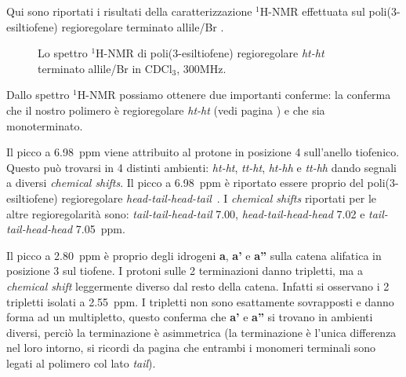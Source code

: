 Qui sono riportati i risultati della caratterizzazione $^1$H-NMR 
effettuata sul poli(3-esiltiofene) regioregolare terminato allile/Br . 
\begin{figure}
\caption{\footnotesize{Lo spettro $^1$H-NMR di poli(3-esiltiofene) regioregolare \emph{ht-ht} terminato allile/Br  in CDCl$_3$, 300MHz.}
\label{fig:P3HT-HNMR}}
\end{figure}

Dallo spettro $^1$H-NMR possiamo ottenere due importanti conferme: la conferma che il nostro polimero è regioregolare \emph{ht-ht} (vedi pagina \pageref{regio-htht}) e che sia monoterminato.

Il picco a 6.98~ppm viene attribuito al protone in posizione 4 sull'anello tiofenico. Questo può trovarsi in 4 distinti ambienti: \emph{ht-ht}, \emph{tt-ht}, \emph{ht-hh} e \emph{tt-hh} dando segnali a diversi \emph{chemical shifts}. Il picco a 6.98~ppm è riportato essere proprio del poli(3-esiltiofene) regioregolare \emph{head-tail-head-tail}~\cite{pol-p3ht-regio}. I \emph{chemical shifts} riportati per le altre regioregolarità sono: \emph{tail-tail-head-tail} 7.00, \emph{head-tail-head-head} 7.02 e \emph{tail-tail-head-head} 7.05~ppm.

Il picco a 2.80~ppm è proprio degli idrogeni {\bf a}, {\bf a'} e {\bf a''} sulla catena alifatica in posizione 3 sul tiofene. I protoni sulle 2 terminazioni danno tripletti, ma a \emph{chemical shift} leggermente diverso dal resto della catena.  Infatti si osservano i 2 tripletti isolati a 2.55~ppm. I tripletti non sono esattamente sovrapposti e danno forma ad un multipletto, questo conferma che {\bf a'} e {\bf a''} si trovano in ambienti diversi, perciò la terminazione è asimmetrica (la terminazione è l'unica differenza nel loro intorno, si ricordi da pagina \pageref{tail-tail} che entrambi i monomeri terminali sono legati al polimero col lato \emph{tail}).

